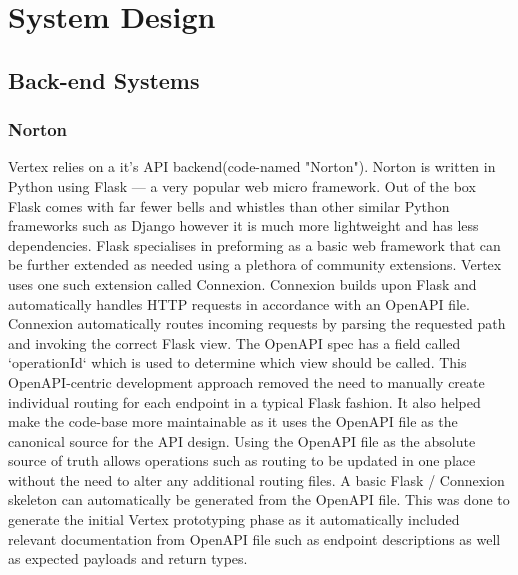 \chapter{System Design}
\section{Back-end Systems}
\subsection{Norton}
Vertex relies on a it's API backend(code-named "Norton"). Norton is written in Python using Flask — a very popular web micro framework. Out of the box Flask comes with far fewer bells and whistles than other similar Python frameworks such as Django however it is much more lightweight and has less dependencies. Flask specialises in preforming as a basic web framework that can be further extended as needed using a plethora of community extensions. Vertex uses one such extension called Connexion. Connexion builds upon Flask and automatically handles HTTP requests in accordance with an OpenAPI file. Connexion automatically routes incoming requests by parsing the requested path and invoking the correct Flask view. The OpenAPI spec has a field called `operationId` which is used to determine which view should be called. This OpenAPI-centric development approach removed the need to manually create individual routing for each endpoint in a typical Flask fashion. It also helped make the code-base more maintainable as it uses the OpenAPI file as the canonical source for the API design. Using the OpenAPI file as the absolute source of truth allows operations such as routing to be updated in one place without the need to alter any additional routing files. A basic Flask / Connexion skeleton can automatically be generated from the OpenAPI file. This was done to generate the initial Vertex prototyping phase as it automatically included relevant documentation from OpenAPI file such as endpoint descriptions as well as expected payloads and return types.


